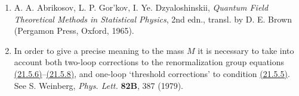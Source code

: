 \begin{enumerate}
\item {}\label{ch21-ref-46}
A. A. Abrikosov, L. P. Gor'kov, I. Ye. Dzyaloshinskii,
\emph{Quantum Field Theoretical Methods in Statistical Physics}, 2nd edn.,
transl. by D. E. Brown (Pergamon Press, Oxford, 1965).

\item {}\label{ch21-ref-47}
In order to give a precise meaning to the mass $M$ it is necessary to take
into account both two-loop corrections to the renormalization group
equations \hyperref[eq:21.5.6]{(21.5.6)}--\hyperref[eq:21.5.8]{(21.5.8)},
and one-loop `threshold corrections' to condition
\hyperref[eq:21.5.5]{(21.5.5)}. See S. Weinberg,
\emph{Phys. Lett.} \textbf{82B}, 387 (1979).
\end{enumerate}
